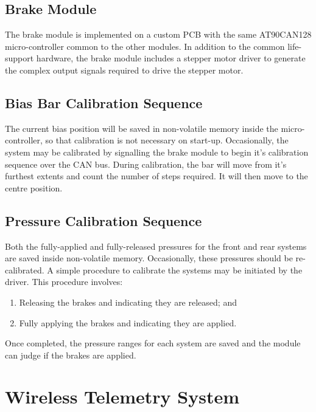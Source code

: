 \subsection{Brake Module}

The brake module is implemented on a custom PCB with the same AT90CAN128 micro-controller common to the other modules. In addition to the common life-support hardware, the brake module includes a stepper motor driver to generate the complex output signals required to drive the stepper motor.

\subsection{Bias Bar Calibration Sequence}

The current bias position will be saved in non-volatile memory inside the micro-controller, so that calibration is not necessary on start-up. Occasionally, the system may be calibrated by signalling the brake module to begin it's calibration sequence over the CAN bus. During calibration, the bar will move from it's furthest extents and count the number of steps required. It will then move to the centre position.

\subsection{Pressure Calibration Sequence}

Both the fully-applied and fully-released pressures for the front and rear systems are saved inside non-volatile memory. Occasionally, these pressures should be re-calibrated. A simple procedure to calibrate the systems may be initiated by the driver. This procedure involves:

\begin{enumerate}
\item Releasing the brakes and indicating they are released; and
\item Fully applying the brakes and indicating they are applied.
\end{enumerate}

Once completed, the pressure ranges for each system are saved and the module can judge if the brakes are applied.

%
%

\section{Wireless Telemetry System}
\label{wireless_telemetry_system}

